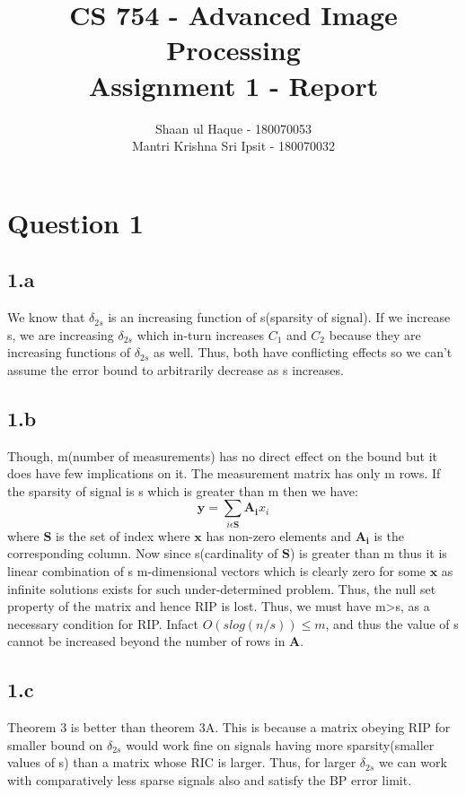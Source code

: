 \documentclass[12pt]{article}
\title{CS 754 - Advanced Image Processing\\Assignment 1 - Report}
\author{Shaan ul Haque - 180070053\\Mantri Krishna Sri Ipsit - 180070032}
\begin{document}
\maketitle

\section*{Question 1}
\subsection*{1.a}
We know that $\delta_{2s}$ is an increasing function of s(sparsity of signal). If we increase s, we are increasing $\delta_{2s}$ which in-turn increases $C_1$ and $C_2$ because they are increasing functions of $\delta_{2s}$ as well. Thus, both have conflicting effects so we can't assume the error bound to arbitrarily decrease as s increases. 
\subsection*{1.b}
Though, m(number of measurements) has no direct effect on the bound but it does have few implications on it. The measurement matrix has only m rows. If the sparsity of signal is s which is greater than m then we have:
\begin{equation*}
    \boldsymbol{y} = \sum_{i\epsilon\boldsymbol{S}}\boldsymbol{A_i}x_i
\end{equation*}
where $\boldsymbol{S}$ is the set of index where $\boldsymbol{x}$ has non-zero elements and $\boldsymbol{A_i}$ is the corresponding column. Now since s(cardinality of $\boldsymbol{S}$) is greater than m thus it is linear combination of s m-dimensional vectors which is clearly zero for some $\boldsymbol{x}$ as infinite solutions exists for such under-determined problem. Thus, the null set property of the matrix and hence RIP is lost. Thus, we must have m>s, as a necessary condition for RIP. Infact $O(slog(n/s))\leq m$, and thus the value of s cannot be increased beyond the number of rows in $\boldsymbol{A}$.
\subsection*{1.c}
Theorem 3 is better than theorem 3A. This is because a matrix obeying RIP for smaller bound on $\delta_{2s}$ would work fine on signals having more sparsity(smaller values of s) than a matrix whose RIC is larger. Thus, for larger $\delta_{2s}$ we can work with comparatively less sparse signals also and satisfy the BP error limit.
\end{document}
